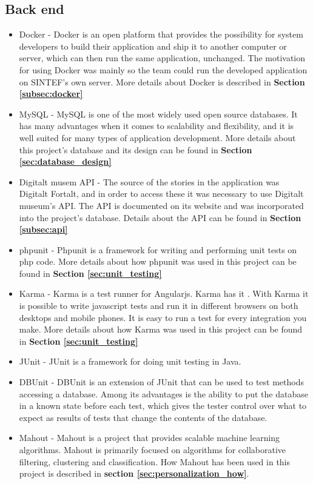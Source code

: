 \subsection{Back end}
\begin{itemize}
	\item Docker \cite{EHW2} - Docker is an open platform that provides the possibility for system developers to build their application and ship it to another computer or server, which can then run the same application, unchanged. The motivation for using Docker was mainly so the team could run the developed application on SINTEF’s own server. More details about Docker is described in \textbf{Section \ref{subsec:docker}}
	\item MySQL \cite{es8} - MySQL is one of the most widely used open source databases. It has many advantages when it comes to scalability and flexibility, and it is well suited for many types of application development. More details about this project’s database and its design can be found in \textbf{Section \ref{sec:database_design}}
	\item Digitalt musem API \cite{digitaltMuseum} - The source of the stories in the application was Digitalt Fortalt, and in order to access these it was necessary to use Digitalt museum’s API. The API is documented on its website and was incorporated into the project’s database. Details about the API can be found in \textbf{Section \ref{subsec:api}}
	\item phpunit \cite{KF2} - Phpunit is a framework for writing and performing unit tests on php code. More details about how phpunit was used in this project can be found in \textbf{Section \ref{sec:unit_testing}}
	\item Karma \cite{KF3} - Karma is a test runner for Angularjs. Karma has it . With Karma it is possible to write javascript tests and run it in different browsers on both desktops and mobile phones. It is easy to run a test for every integration you make. More details about how Karma was used in this project can be found in \textbf{Section \ref{sec:unit_testing}}
	\item JUnit \cite{as7} - JUnit is a framework for doing unit testing in Java. 
	\item DBUnit \cite{as8} - DBUnit is an extension of JUnit that can be used to test methods accessing a database. Among its advantages is the ability to put the database in a known state before each test, which gives the tester control over what to expect as results of tests that change the contents of the database.
	\item Mahout \cite{as9} - Mahout is a project that provides scalable machine learning algorithms. Mahout is primarily focused on algorithms for collaborative filtering, clustering and classification. How Mahout has been used in this project is described in \textbf{section \ref{sec:personalization_how}}.
\end{itemize}

